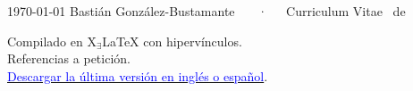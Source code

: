 \documentclass[11pt, a4paper]{../bgonzalezbustamante-style}
\begin{document}
\makecvheader

\makecvfooter
  {\today}
  {Bastián González-Bustamante ~~~·~~~Curriculum Vitae}
  {\thepage\ de \pageref*{LastPage}}




















\vspace{10mm}
\raggedleft
{\footnotesize Compilado en {\small X$_{\exists}${\LaTeX}} con hipervínculos.}\\
{\footnotesize Referencias a petición.}\\
{\footnotesize \textcolor{oxfordblue}{\normalsize \faGithub} \href{https://bgonzalezbustamante.github.io/CV-XeLaTeX/}{\textcolor{blue}{Descargar la última versión en inglés o español}}.}
\end{document}
